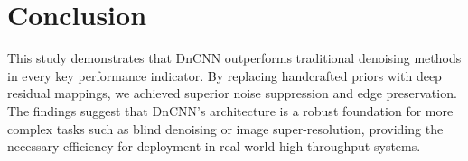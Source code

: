 \documentclass[twocolumn, 10pt]{article}
\begin{document}
\section{Conclusion}
This study demonstrates that DnCNN outperforms traditional denoising methods in every key performance indicator. By replacing handcrafted priors with deep residual mappings, we achieved superior noise suppression and edge preservation. The findings suggest that DnCNN's architecture is a robust foundation for more complex tasks such as blind denoising or image super-resolution, providing the necessary efficiency for deployment in real-world high-throughput systems.
\end{document}
